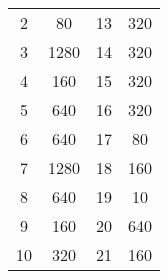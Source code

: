 \documentclass{uofa-eng-assignment}
\begin{document}
\begin{enumerate}
\begin{tabular}{c c c c}
            2     & 80   & 13    & 320 \\

            3     & 1280 & 14    & 320 \\

            4     & 160  & 15    & 320 \\

            5     & 640  & 16    & 320 \\

            6     & 640  & 17    & 80  \\

            7     & 1280 & 18    & 160 \\

            8     & 640  & 19    & 10  \\

            9     & 160  & 20    & 640 \\

            10    & 320  & 21    & 160 \\


\end{tabular}
\end{enumerate}
\end{document}
